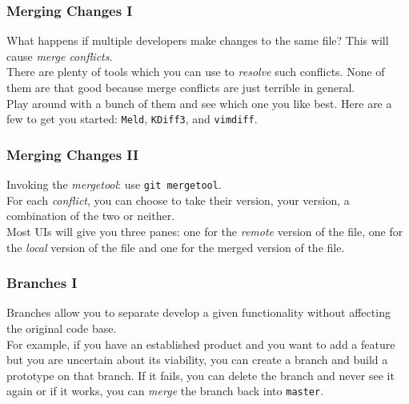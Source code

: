 \documentclass{beeper}
\begin{document}
\begin{frame}
    \frametitle{Merging Changes I}

    What happens if multiple developers make changes to the same file? This will
    cause \textit{merge conflicts}.\\

    There are plenty of tools which you can use to \textit{resolve} such
    conflicts. None of them are that good because merge conflicts are just
    terrible in general.\\

    Play around with a bunch of them and see which one you like best. Here are a
    few to get you started: \texttt{Meld}, \texttt{KDiff3}, and
    \texttt{vimdiff}.\\
\end{frame}

\begin{frame}
    \frametitle{Merging Changes II}

    Invoking the \textit{mergetool}: use \texttt{git mergetool}.\\

    For each \textit{conflict}, you can choose to take their version, your
    version, a combination of the two or neither.\\

    Most UIs will give you three panes: one for the \textit{remote} version of
    the file, one for the \textit{local} version of the file and one for the
    merged version of the file.

\end{frame}

\begin{frame}
    \frametitle{Branches I}

    Branches allow you to separate develop a given functionality without
    affecting the original code base.\\

    For example, if you have an established product and you want to add a
    feature but you are uncertain about its viability, you can create a branch
    and build a prototype on that branch. If it fails, you can delete the branch
    and never see it again or if it works, you can \textit{merge} the branch
    back into \texttt{master}.
\end{frame}
\end{document}
